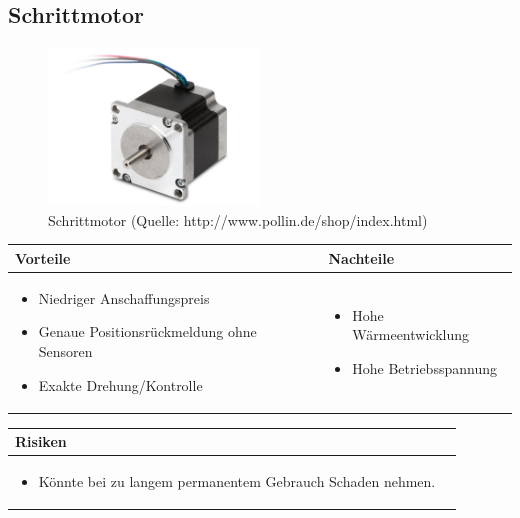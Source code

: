 \pagebreak


\subsection{Schrittmotor}

\begin{figure}[h!]%
\centering
\includegraphics[width=0.5\textwidth]{fig/schrittmotor.JPG}
\caption{Schrittmotor (Quelle: http://www.pollin.de/shop/index.html)}
\label{fig:Java}
\end{figure}

\begin{table}[h]
\begin{tabular}{p{} | p{}}


 \textbf{Vorteile} & \textbf{Nachteile} \\ \hline
	 
\begin{itemize}
\item Niedriger Anschaffungspreis
\item Genaue Positionsrückmeldung ohne Sensoren
\item Exakte Drehung/Kontrolle
\end{itemize}

 
 &
 
\begin{itemize}
\item Hohe Wärmeentwicklung
\item Hohe Betriebsspannung
\end{itemize}

\end{tabular}
\end{table}

\begin{table}[h]
\begin{tabular}{p{}p{}}


 \textbf{Risiken} & \\ \hline
	 
\begin{itemize}
\item Könnte bei zu langem permanentem Gebrauch Schaden nehmen.
\end{itemize}

 
\end{tabular}
\end{table}

